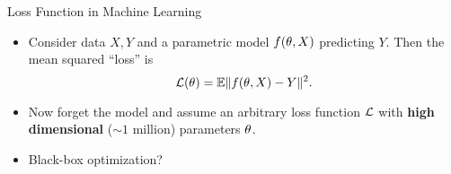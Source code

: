 \begin{frame}{Loss Function in Machine Learning}
	\begin{itemize}
		\item 
		Consider data \(X,Y\) and a parametric model \(f(\theta, X)\) predicting
		\(Y\). Then the mean squared ``loss'' is
		\[
			\mathcal{L}(\theta) = \mathbb{E}\|f(\theta, X)- Y\|^2.
		\]
		\item<2->
		Now forget the model and assume an arbitrary loss function \(\mathcal{L}\) with
		\textbf{high dimensional} (\(\sim 1\) million) parameters \(\theta\).
		\item<3-> Black-box optimization?
	\end{itemize}
\end{frame}